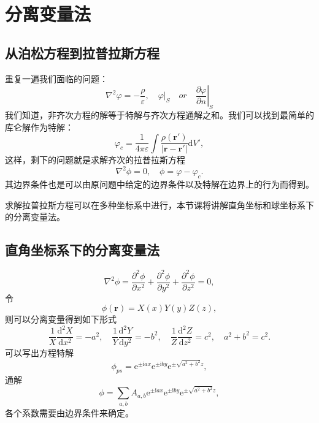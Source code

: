 \documentclass[UTF8]{ctexbook}
\newcommand{\e}{\mathrm{e}}
\renewcommand{\d}{\mathrm{d}}
\renewcommand{\b}{\boldsymbol}
\renewcommand{\i}{\mathrm{i}}
\newcommand{\kk}{\frac{1}{4\pi\varepsilon}}
\numberwithin{equation}{chapter}
\begin{document}
	\section{分离变量法}
	\subsection{从泊松方程到拉普拉斯方程}
	重复一遍我们面临的问题：
	\[\nabla^2\varphi=-\frac{\rho}{\varepsilon},\quad \varphi|_S \quad or \quad \left.\frac{\partial \varphi}{\partial n}\right|_S\]
	我们知道，非齐次方程的解等于特解与齐次方程通解之和。我们可以找到最简单的库仑解作为特解：
	\[\varphi_c=\kk\int \frac{\rho(\b{r}')}{|\b{r}-\b{r}'|}\d V',\]
	这样，剩下的问题就是求解齐次的拉普拉斯方程
	\[\nabla^2 \phi=0,\quad \phi=\varphi-\varphi_c.\]
	其边界条件也是可以由原问题中给定的边界条件以及特解在边界上的行为而得到。
	
	求解拉普拉斯方程可以在多种坐标系中进行，本节课将讲解直角坐标和球坐标系下的分离变量法。
	
	\subsection{直角坐标系下的分离变量法}
	\[\nabla^2 \phi=\frac{\partial^2 \phi}{\partial x^2}+\frac{\partial^2 \phi}{\partial y^2}+\frac{\partial^2 \phi}{\partial z^2}=0,\]
	令
	\[\phi(\b{r})=X(x)Y(y)Z(z),\]
	则可以分离变量得到如下形式
	\[\frac{1}{X}\frac{\d^2 X}{\d x^2}=-a^2,\quad \frac{1}{Y}\frac{\d^2 Y}{\d y^2}=-b^2,\quad \frac{1}{Z}\frac{\d^2 Z}{\d z^2}=c^2,\quad a^2+b^2=c^2.\]
	可以写出方程特解
	\[\phi_{ps}=\e^{\pm\i ax}\e^{\pm \i by}\e^{\pm \sqrt{a^2+b^2}z},\]
	通解
	\[\phi=\sum_{a,b}A_{a,b}\e^{\pm\i ax}\e^{\pm \i by}\e^{\pm \sqrt{a^2+b^2}z},\]
	各个系数需要由边界条件来确定。
	
\end{document}
